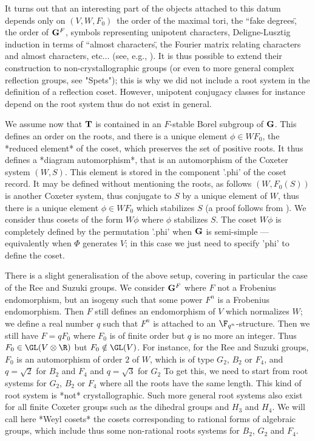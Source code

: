 It turns out that an interesting part of the objects attached to this datum
depends  only on $(V,W, F_0)$\:\ the order  of the maximal tori, the ``fake
degrees\", the order of ${\bf G}^F$, symbols representing unipotent characters,
Deligne-Lusztig  induction in  terms of  ``almost characters\", the Fourier
matrix  relating characters  and almost characters, etc$\ldots$ (see, e.g.,
\cite{BMM93}).  It  is  thus  possible  to  extend  their  construction  to
non-crystallographic  groups (or  even to  more general  complex reflection
groups,  see "Spets"); this is why we did  not include a root system in the
definition  of a reflection coset. However, unipotent conjugacy classes for
instance depend on the root system thus do not exist in general.

We  assume now that ${\bf T}$  is contained in an  $F$-stable Borel subgroup of
${\bf G}$.  This defines an order  on the roots, and  there is a unique element
$\phi\in  W F_0$, the  *reduced element* of  the coset, which preserves the
set of positive roots. It thus defines a *diagram automorphism*, that is an
automorphism  of the Coxeter system $(W,S)$.  This element is stored in the
component  '.phi' of the coset record. It may be defined without mentioning
the  roots,  as  follows\:  $(W,F_0(S))$  is  another  Coxeter system, thus
conjugate to $S$ by a unique element of $W$, thus there is a unique element
$\phi\in WF_0$ which stabilizes $S$ (a proof follows from \cite[Theoreme 1,
chap.  V, \S 3]{Bou68}). We  consider thus cosets of the form $W\phi$ where
$\phi$  stabilizes $S$.  The coset  $W \phi$  is completely  defined by the
permutation  '.phi' when ${\bf G}$ is  semi-simple --- equivalently when $\Phi$
generates  $V$; in this  case we just  need to specify  'phi' to define the
coset.

There is a slight generalisation of the above setup, covering in particular
the  case of the Ree and Suzuki groups. We consider ${\bf G}^F$ where $F$ not a
Frobenius  endomorphism, but  an isogeny  such that  some power  $F^n$ is a
Frobenius endomorphism. Then $F$ still defines an endomorphism of $V$ which
normalizes  $W$; we define a real number $q$ such that $F^n$ is attached to
an  $\F_{q^n}$-structure. Then  we still  have $F=q  F_0$ where $F_0$ is of
finite  order but $q$  is no more  an integer. Thus $F_0\in\GL(V\otimes\R)$
but  $F_0\notin\GL(V)$. For instance, for the  Ree and Suzuki groups, $F_0$
is  an automorphism of order  $2$ of $W$, which  is of type $G_2$, $B_2$ or
$F_4$, and $q=\sqrt 2$ for $B_2$ and $F_4$ and $q=\sqrt 3$ for $G_2$ To get
this,  we need to start  from root systems for  $G_2$, $B_2$ or $F_4$ where
all  the roots  have the  same length.  This kind  of root  system is *not*
crystallographic.  Such more general root systems also exist for all finite
Coxeter  groups such as  the dihedral groups  and $H_3$ and  $H_4$. We will
call  here  *Weyl  cosets*  the  cosets  corresponding to rational forms of
algebraic  groups, which include  thus some non-rational  roots systems for
$B_2$, $G_2$ and $F_4$.

